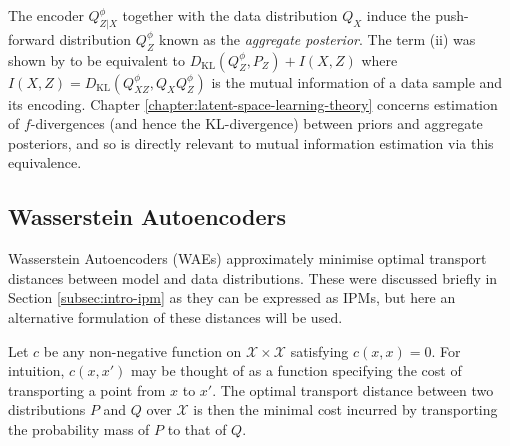 The encoder $Q^\phi_{Z|X}$ together with the data distribution $Q_X$ induce the push-forward distribution $Q^\phi_Z$ known as the \emph{aggregate posterior}.
The term (ii) was shown by \cite{hoffman2016elbo} to be equivalent to $D_{\text{KL}}(Q^\phi_Z , P_Z) + I(X,Z)$ where $I(X,Z) = D_{\text{KL}}(Q^\phi_{XZ} , Q_XQ^\phi_{Z})$ is the mutual information of a data sample and its encoding.
Chapter \ref{chapter:latent-space-learning-theory} concerns estimation of $f$-divergences (and hence the KL-divergence) between priors and aggregate posteriors, and so is directly relevant to mutual information estimation via this equivalence.





\subsection{Wasserstein Autoencoders}\label{subsec:chapter2-wae}

Wasserstein Autoencoders (WAEs) \citep{tolstikhin2017wasserstein} approximately minimise optimal transport distances between model and data distributions.
These were discussed briefly in Section \ref{subsec:intro-ipm} as they can be expressed as IPMs, but here an alternative formulation of these distances will be used.

Let $c$ be any non-negative function on $\mathcal{X} \times \mathcal{X}$ satisfying $c(x,x)=0$.
For intuition, $c(x, x')$ may be thought of as a function specifying the cost of transporting a point from $x$ to $x'$.
The optimal transport distance between two distributions $P$ and $Q$ over $\mathcal{X}$ is then the minimal cost incurred by transporting the probability mass of $P$ to that of $Q$.

